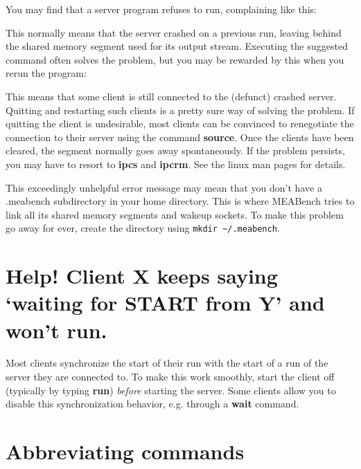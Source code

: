 \documentclass[12pt,oneside]{book}
\def\meabench{{MEABench}\xspace}
\def\prog#1{{\bf #1}}
\def\cmd#1{{\bf #1}}
\def\filename#1{{\sf #1}\xspace}
\begin{document}
You may find that a server program refuses to run, complaining like
this:
\begin{quotation}
\end{quotation}
This normally means that the server crashed on a previous
run, leaving behind
the shared memory segment used for its output stream. Executing the
suggested command often solves the problem, but you may be rewarded by
this when you rerun the program:
\begin{quotation}
\end{quotation}
This means that some client is still connected to the (defunct)
crashed server. Quitting and restarting such clients is a pretty sure
way of solving the problem. If quitting the client is undesirable,
most clients can be convinced to renegotiate the connection to their
server using the command \cmd{source}. Once the clients have been
cleared, the segment normally goes away spontaneously. If the problem
persists, you may have to resort to \prog{ipcs} and \prog{ipcrm}. See
the linux man pages for details.
\begin{quotation}
\end{quotation}
This exceedingly unhelpful error message may mean that you
don't have a \filename{.meabench} subdirectory in your home directory. 
This is where \meabench tries to link all its shared memory segments
and wakeup sockets. To make this problem go away for ever, create the
directory using \verb!mkdir ~/.meabench!.

\section{Help! Client X keeps saying `waiting for START from Y' and won't
run.}

Most clients synchronize the start of their run with the start of a
run of the server they are connected to. To make this work smoothly,
start the client off (typically by typing \cmd{run}) \emph{before} starting
the server. Some clients allow you to disable this synchronization
behavior, e.g. through a \cmd{wait} command.

\section{Abbreviating commands}
\end{document}
